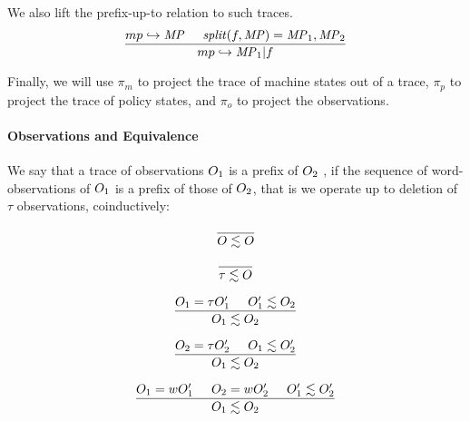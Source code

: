 \documentclass[acmsmall,review,anonymous]{acmart}\settopmatter{printfolios=true,printccs=false,printacmref=false}
\begin{document}
We also lift the prefix-up-to relation to such traces.
  \[\frac{mp \hookrightarrow \mathit{MP} \hspace{.5cm} \mathit{split}(f,\mathit{MP}) = \mathit{MP}_1,\mathit{MP}_2}
         {mp \hookrightarrow \mathit{MP}_1 | f}\]

Finally, we will use \(\pi_m\) to project the trace of machine states
out of a trace, \(\pi_p\) to project the trace of policy states, and
\(\pi_o\) to project the observations.
       

\paragraph*{Observations and Equivalence}

We say that a trace of observations $O_1$ is a prefix of $O_2$
, if the
sequence of word-observations of $O_1$ is a prefix of those of
$O_2$, that is we operate up to deletion of \(\tau\) observations, coinductively:

\[\frac{} {O \lesssim O}\]

\[\frac{} {\tau \lesssim O}\]

\[\frac{O_1 = \tau O_1' \hspace{.5cm} O_1' \lesssim O_2}
       {O_1 \lesssim O_2}\]

\[\frac{O_2 = \tau O_2' \hspace{.5cm} O_1 \lesssim O_2'}
       {O_1 \lesssim O_2}\]

\[\frac{O_1 = w O_1' \hspace{.5cm} O_2 = w O_2' \hspace{.5cm} O_1' \lesssim O_2'}
       {O_1 \lesssim O_2}\]

    
\end{document}
